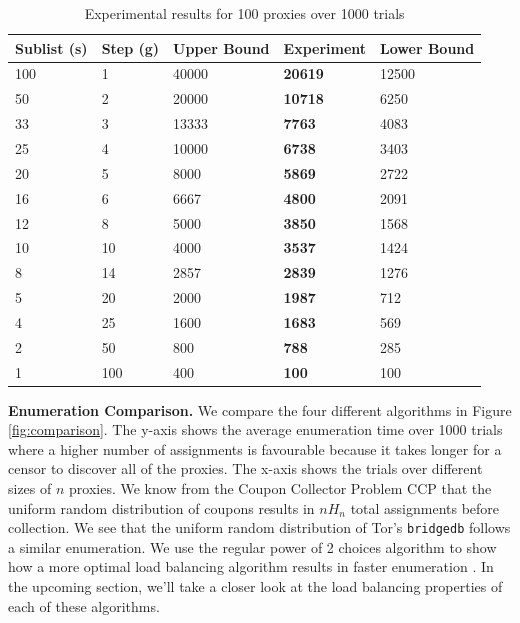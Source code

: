 \begin{table}[t]
\centering
\begin{tabular}{l|l|l|l|l}
             Sublist (s) & Step (g) & Upper Bound & Experiment & Lower Bound  \\
\hline
\hline
100 & 1 & 40000 & \textbf{20619} & 12500 \\\hline
50 & 2 & 20000 & \textbf{10718}	& 6250 \\\hline
33 & 3 & 13333	& \textbf{7763} & 4083 \\\hline
25 & 4 & 10000 & \textbf{6738} & 3403 \\\hline
20 & 5 & 8000 & \textbf{5869} & 2722\\\hline
16 & 6 & 6667 & \textbf{4800} & 2091 \\\hline
12 & 8 & 5000 & \textbf{3850} & 1568\\\hline
10 & 10 & 4000	& \textbf{3537} & 1424\\\hline
8 & 14 & 2857 & \textbf{2839} & 1276\\\hline
5 & 20 & 2000 & \textbf{1987} & 712\\\hline
4 & 25 & 1600 & \textbf{1683} & 569\\\hline
2 & 50 & 800 & \textbf{788} & 285\\\hline
1 & 100 & 400 & \textbf{100} & 100\\\hline

\end{tabular}
\caption{Experimental results for 100 proxies over 1000 trials\label{tab:enumn100} }
\end{table}

\textbf{Enumeration Comparison.} We compare the four different algorithms in Figure \ref{fig:comparison}. The y-axis shows the average enumeration time over 1000 trials where a higher number of assignments is favourable because it takes longer for a censor to discover all of the proxies. The x-axis shows the trials over different sizes of $n$ proxies. We know from the Coupon Collector Problem \ac{CCP} that the uniform random distribution of coupons results in $nH_n$ total assignments before collection. We see that the uniform random distribution of Tor's \texttt{bridgedb} follows a similar enumeration. We use the regular power of 2 choices algorithm to show how a more optimal load balancing algorithm results in faster enumeration \cite{xu2011generalized}. In the upcoming section, we'll take a closer look at the load balancing properties of each of these algorithms.

